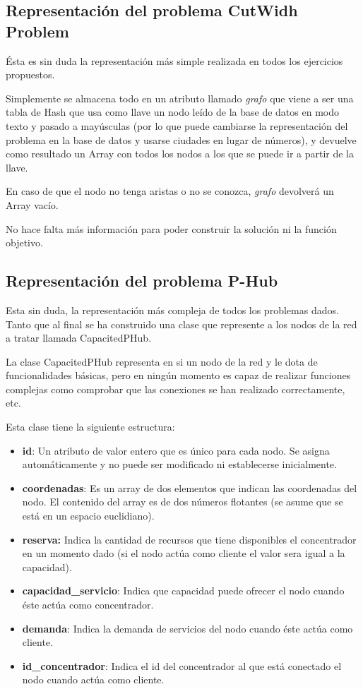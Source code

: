 \documentclass[12pt,a4paper,draft,openany]{article}
\begin{document}
\subsection{Representación del problema CutWidh Problem}
Ésta es sin duda la representación más simple realizada en todos los ejercicios propuestos. 

Simplemente se almacena todo en un atributo llamado \emph{grafo} que viene a ser una tabla de Hash que usa como llave un nodo leído de la base de datos en modo texto y pasado a mayúsculas (por lo que puede cambiarse la representación del problema en la base de datos y usarse ciudades en lugar de números), y devuelve como resultado un Array con todos los nodos a los que se puede ir a partir de la llave.

En caso de que el nodo no tenga aristas o no se conozca, \emph{grafo} devolverá un Array vacío.

No hace falta más información para poder construir la solución ni la función objetivo.

\subsection{Representación del problema P-Hub}
Esta sin duda, la representación más compleja de todos los problemas dados. Tanto que al final se ha construido una clase que represente a los nodos de la red a tratar llamada CapacitedPHub.

La clase CapacitedPHub representa en si un nodo de la red y le dota de funcionalidades básicas, pero en ningún momento es capaz de realizar funciones complejas como comprobar que las conexiones se han realizado correctamente, etc.

Esta clase tiene la siguiente estructura:
\begin{itemize}
\item \textbf{id}: Un atributo de valor entero que es único para cada nodo. Se asigna automáticamente y no puede ser modificado ni establecerse inicialmente.
\item \textbf{coordenadas}: Es un array de dos elementos que indican las coordenadas del nodo. El contenido del array es de dos números flotantes (se asume que se está en un espacio euclidiano).
\item \textbf{reserva:} Indica la cantidad de recursos que tiene disponibles el concentrador en un momento dado (si el nodo actúa como cliente el valor sera igual a la capacidad).
\item \textbf{capacidad\_servicio}: Indica que capacidad puede ofrecer el nodo cuando éste actúa como concentrador.
\item \textbf{demanda}: Indica la demanda de servicios del nodo cuando éste actúa como cliente.
\item \textbf{id\_concentrador}: Indica el id del concentrador al que está conectado el nodo cuando actúa como cliente.
\end{itemize}
\end{document}
